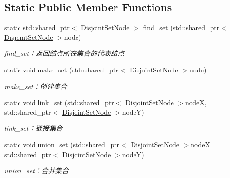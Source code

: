 \subsection*{Static Public Member Functions}
\begin{DoxyCompactItemize}
\item 
static std\+::shared\+\_\+ptr$<$ \hyperlink{struct_introduction_to_algorithm_1_1_set_algorithm_1_1_disjoint_set_node}{Disjoint\+Set\+Node} $>$ \hyperlink{struct_introduction_to_algorithm_1_1_set_algorithm_1_1_disjoint_set_node_a85fa0b8f80ba6529936ba2103c68194c}{find\+\_\+set} (std\+::shared\+\_\+ptr$<$ \hyperlink{struct_introduction_to_algorithm_1_1_set_algorithm_1_1_disjoint_set_node}{Disjoint\+Set\+Node} $>$node)
\begin{DoxyCompactList}\small\item\em find\+\_\+set：返回结点所在集合的代表结点 \end{DoxyCompactList}\item 
static void \hyperlink{struct_introduction_to_algorithm_1_1_set_algorithm_1_1_disjoint_set_node_a7346337c6f47bf066844c7101058cd92}{make\+\_\+set} (std\+::shared\+\_\+ptr$<$ \hyperlink{struct_introduction_to_algorithm_1_1_set_algorithm_1_1_disjoint_set_node}{Disjoint\+Set\+Node} $>$node)
\begin{DoxyCompactList}\small\item\em make\+\_\+set：创建集合 \end{DoxyCompactList}\item 
static void \hyperlink{struct_introduction_to_algorithm_1_1_set_algorithm_1_1_disjoint_set_node_ac5fff2fa07d82ed04529aa9159d37efc}{link\+\_\+set} (std\+::shared\+\_\+ptr$<$ \hyperlink{struct_introduction_to_algorithm_1_1_set_algorithm_1_1_disjoint_set_node}{Disjoint\+Set\+Node} $>$node\+X, std\+::shared\+\_\+ptr$<$ \hyperlink{struct_introduction_to_algorithm_1_1_set_algorithm_1_1_disjoint_set_node}{Disjoint\+Set\+Node} $>$node\+Y)
\begin{DoxyCompactList}\small\item\em link\+\_\+set：链接集合 \end{DoxyCompactList}\item 
static void \hyperlink{struct_introduction_to_algorithm_1_1_set_algorithm_1_1_disjoint_set_node_aeb6281c8d6ec20987015fb1d1421b309}{union\+\_\+set} (std\+::shared\+\_\+ptr$<$ \hyperlink{struct_introduction_to_algorithm_1_1_set_algorithm_1_1_disjoint_set_node}{Disjoint\+Set\+Node} $>$node\+X, std\+::shared\+\_\+ptr$<$ \hyperlink{struct_introduction_to_algorithm_1_1_set_algorithm_1_1_disjoint_set_node}{Disjoint\+Set\+Node} $>$node\+Y)
\begin{DoxyCompactList}\small\item\em union\+\_\+set：合并集合 \end{DoxyCompactList}\end{DoxyCompactItemize}
